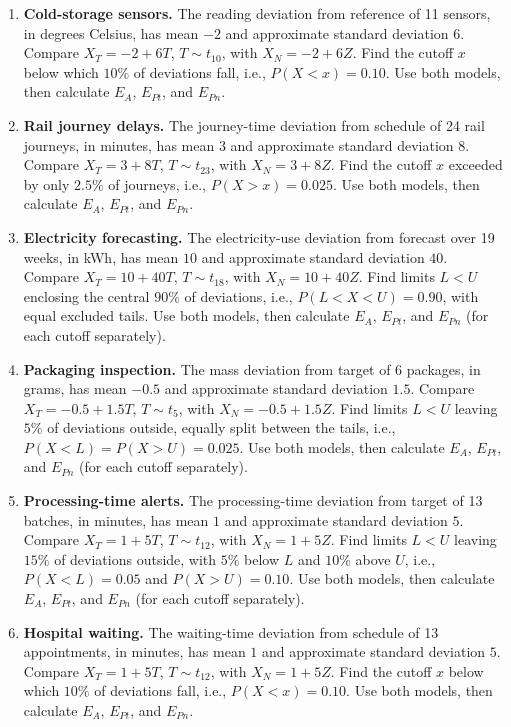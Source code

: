 \begin{enumerate}[leftmargin=*,label=\textbf{\arabic*.},itemsep=5pt,parsep=0pt,topsep=2pt]
		\item \textbf{Cold-storage sensors.} The reading deviation from reference of 11 sensors, in degrees Celsius, has mean $-2$ and approximate standard deviation $6$. Compare $X_T=-2+6T$, $T\sim t_{10}$, with $X_N=-2+6Z$. Find the cutoff $x$ below which $10\%$ of deviations fall, i.e., $P(X<x)=0.10$. Use both models, then calculate $E_A$, $E_{Pt}$, and $E_{Pn}$.
		\item \textbf{Rail journey delays.} The journey-time deviation from schedule of 24 rail journeys, in minutes, has mean $3$ and approximate standard deviation $8$. Compare $X_T=3+8T$, $T\sim t_{23}$, with $X_N=3+8Z$. Find the cutoff $x$ exceeded by only $2.5\%$ of journeys, i.e., $P(X>x)=0.025$. Use both models, then calculate $E_A$, $E_{Pt}$, and $E_{Pn}$.
		\item \textbf{Electricity forecasting.} The electricity-use deviation from forecast over 19 weeks, in kWh, has mean $10$ and approximate standard deviation $40$. Compare $X_T=10+40T$, $T\sim t_{18}$, with $X_N=10+40Z$. Find limits $L<U$ enclosing the central $90\%$ of deviations, i.e., $P(L<X<U)=0.90$, with equal excluded tails. Use both models, then calculate $E_A$, $E_{Pt}$, and $E_{Pn}$ (for each cutoff separately).
		\item \textbf{Packaging inspection.} The mass deviation from target of 6 packages, in grams, has mean $-0.5$ and approximate standard deviation $1.5$. Compare $X_T=-0.5+1.5T$, $T\sim t_{5}$, with $X_N=-0.5+1.5Z$. Find limits $L<U$ leaving $5\%$ of deviations outside, equally split between the tails, i.e., $P(X<L)=P(X>U)=0.025$. Use both models, then calculate $E_A$, $E_{Pt}$, and $E_{Pn}$ (for each cutoff separately).
		\item \textbf{Processing-time alerts.} The processing-time deviation from target of 13 batches, in minutes, has mean $1$ and approximate standard deviation $5$. Compare $X_T=1+5T$, $T\sim t_{12}$, with $X_N=1+5Z$. Find limits $L<U$ leaving $15\%$ of deviations outside, with $5\%$ below $L$ and $10\%$ above $U$, i.e., $P(X<L)=0.05$ and $P(X>U)=0.10$. Use both models, then calculate $E_A$, $E_{Pt}$, and $E_{Pn}$ (for each cutoff separately).
		
		\newpage
		
		\item \textbf{Hospital waiting.} The waiting-time deviation from schedule of 13 appointments, in minutes, has mean $1$ and approximate standard deviation $5$. Compare $X_T=1+5T$, $T\sim t_{12}$, with $X_N=1+5Z$. Find the cutoff $x$ below which $10\%$ of deviations fall, i.e., $P(X<x)=0.10$. Use both models, then calculate $E_A$, $E_{Pt}$, and $E_{Pn}$.
		

\end{enumerate}
